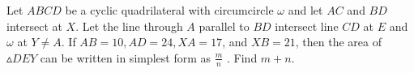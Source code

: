 Let $ABCD$ be a cyclic quadrilateral with circumcircle $\omega$ and let $AC$ and $BD$ intersect at $X$. Let the line through $A$ parallel to $BD$ intersect line $CD$ at $E$ and $\omega$  at $Y \ne A$. If $AB = 10, AD = 24, XA = 17$, and $XB = 21$, then the area of $\vartriangle DEY$ can be written in simplest form as $\frac{m}{n}$ . Find $m + n$.